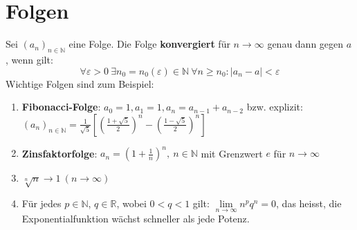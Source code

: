 \documentclass[a4paper,10pt]{scrartcl}
\newcommand{\limi}{\lim\limits_{n\rightarrow \infty}}
\begin{document}
\section{Folgen}
Sei $(a_n)_{n\in \mathbb{N}}$ eine Folge. Die Folge \textbf{konvergiert} für $n\to \infty$ genau dann gegen $a$, wenn gilt: 
\begin{equation*}
	\forall \varepsilon>0\ \exists n_0=n_0(\varepsilon) \in \mathbb{N} \ \forall n\geq n_0 : |a_n-a|<\varepsilon 
\end{equation*}
Wichtige Folgen sind zum Beispiel:
\begin{enumerate}[label=$\circ$]
	\item \textbf{Fibonacci-Folge}: $a_0=1, a_1=1, a_n=a_{n-1}+a_{n-2}$ bzw. explizit: 
	$ (a_{n})_{n\in \mathbb{N}}={\frac {1}{\sqrt {5}}}\left[\left({\frac {1+{\sqrt {5}}}{2}}\right)^{n}-\left({\frac {1-{\sqrt {5}}}{2}}\right)^{n}\right] $
	\item \textbf{Zinsfaktorfolge}: $a_n = \left( 1+\frac{1}{n} \right)^n, \ n \in \mathbb{N}$ mit Grenzwert $e$ für $n\to \infty$
	\item $\sqrt[n]{n} \to 1 \ (n\to \infty)$ 
	\item Für jedes $p\in \mathbb{N}$, $q\in \mathbb{R}$, wobei $0<q<1$ gilt: $\limi n^pq^n=0$, das heisst, die Exponentialfunktion wächst schneller als jede Potenz. 
\end{enumerate}
\end{document}
